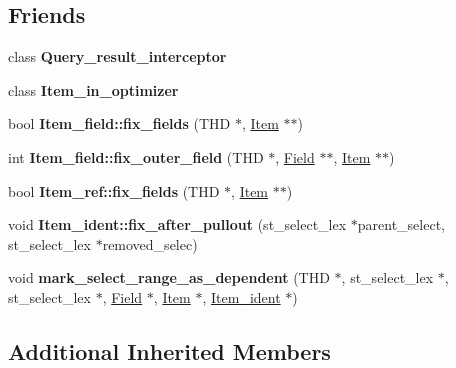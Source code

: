 \subsection*{Friends}
\begin{DoxyCompactItemize}
\item 
\mbox{\label{classItem__subselect_a171c54b34efda791349fef8fb7014485}} 
class {\bfseries Query\+\_\+result\+\_\+interceptor}
\item 
\mbox{\label{classItem__subselect_a6d0c03141d3908698d518f2e65c89b2e}} 
class {\bfseries Item\+\_\+in\+\_\+optimizer}
\item 
\mbox{\label{classItem__subselect_a9e9b547973700504ec6d2f21f26c0d64}} 
bool {\bfseries Item\+\_\+field\+::fix\+\_\+fields} (T\+HD $\ast$, \mbox{\hyperlink{classItem}{Item}} $\ast$$\ast$)
\item 
\mbox{\label{classItem__subselect_a9b2a0926694cd97186b608ba0498dbd6}} 
int {\bfseries Item\+\_\+field\+::fix\+\_\+outer\+\_\+field} (T\+HD $\ast$, \mbox{\hyperlink{classField}{Field}} $\ast$$\ast$, \mbox{\hyperlink{classItem}{Item}} $\ast$$\ast$)
\item 
\mbox{\label{classItem__subselect_a755236b0c507b1a56e79babb63dfc604}} 
bool {\bfseries Item\+\_\+ref\+::fix\+\_\+fields} (T\+HD $\ast$, \mbox{\hyperlink{classItem}{Item}} $\ast$$\ast$)
\item 
\mbox{\label{classItem__subselect_aa2aec9b84c47a9fabb4ee1d089a4677d}} 
void {\bfseries Item\+\_\+ident\+::fix\+\_\+after\+\_\+pullout} (st\+\_\+select\+\_\+lex $\ast$parent\+\_\+select, st\+\_\+select\+\_\+lex $\ast$removed\+\_\+selec)
\item 
\mbox{\label{classItem__subselect_ad1278d074381aaabb1db15fcf41cdf66}} 
void {\bfseries mark\+\_\+select\+\_\+range\+\_\+as\+\_\+dependent} (T\+HD $\ast$, st\+\_\+select\+\_\+lex $\ast$, st\+\_\+select\+\_\+lex $\ast$, \mbox{\hyperlink{classField}{Field}} $\ast$, \mbox{\hyperlink{classItem}{Item}} $\ast$, \mbox{\hyperlink{classItem__ident}{Item\+\_\+ident}} $\ast$)
\end{DoxyCompactItemize}
\subsection*{Additional Inherited Members}


